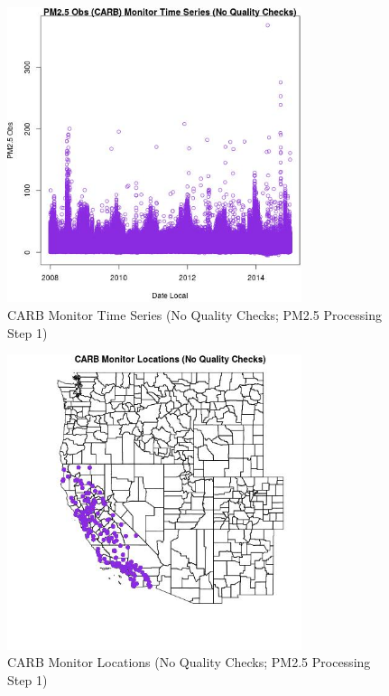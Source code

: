 
\begin{figure} 
\centering  
\includegraphics[width=0.77\textwidth]{Code_Outputs/PM25Source8TSstep1_PM25_ObsvDate_Local.jpg} 
\caption{\label{fig:PM25Source8TSstep1PM25_ObsvDate_Local}CARB Monitor Time Series (No Quality Checks; PM2.5 Processing Step 1)} 
\end{figure} 
 

\begin{figure} 
\centering  
\includegraphics[width=0.77\textwidth]{Code_Outputs/PM25Source8TSstep1_MapCARBLocations.jpg} 
\caption{\label{fig:PM25Source8TSstep1MapCARBLocations}CARB Monitor Locations (No Quality Checks; PM2.5 Processing Step 1)} 
\end{figure} 
 
